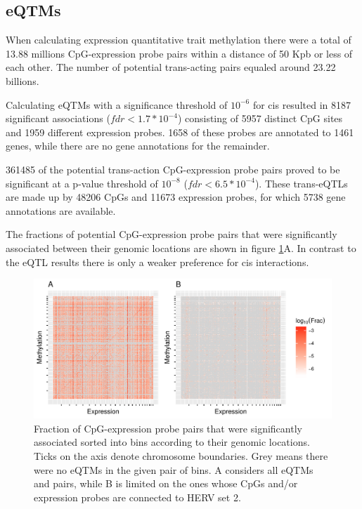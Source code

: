 \documentclass[a4paper,12pt,twoside,openright]{article}
\begin{document}
\subsection{eQTMs}
\label{Results:eQTMs}
When calculating expression quantitative trait methylation there were a total of 13.88 millions CpG-expression probe pairs within a distance of 50 Kpb or less of each other. The number of potential trans-acting pairs equaled around 23.22 billions. 

Calculating eQTMs with a significance threshold of $10^{-6}$ for cis resulted in 8187 significant associations ($fdr<1.7*10^{-4}$) consisting of 5957 distinct CpG sites and 1959 different expression probes. 1658 of these probes are annotated to 1461 genes, while there are no gene annotations for the remainder. 

361485 of the potential trans-action CpG-expression probe pairs proved to be significant at a p-value threshold of $10^{-8}$ ($fdr<6.5*10^{-4}$). These trans-eQTLs are made up by 48206 CpGs and 11673 expression probes, for which 5738 gene annotations are available. 

The fractions of potential CpG-expression probe pairs that were significantly associated between their genomic locations are shown in figure \ref{fig:global.eqtm.heatmap}A. In contrast to the eQTL results there is only a weaker preference for cis interactions. 

\begin{figure}[tb]
	\includegraphics[scale = 1, keepaspectratio = true]{../figures/eqtm_all_herv_heatmap}  
	\caption{Fraction of CpG-expression probe pairs that were significantly associated sorted into bins according to their genomic locations. Ticks on the axis denote chromosome boundaries. Grey means there were no eQTMs in the given pair of bins. A considers all eQTMs and pairs, while B is limited on the ones whose CpGs and/or expression probes are connected to HERV set 2.}
    \label{fig:global.eqtm.heatmap}
\end{figure}
\end{document}
